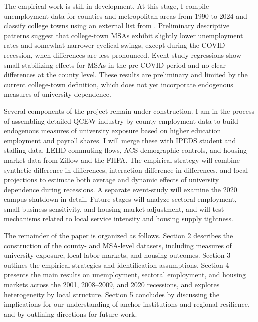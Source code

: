 The empirical work is still in development. At this stage, I compile unemployment data for counties and metropolitan areas from 1990 to 2024 and classify college towns using an external list from \citet{GumprechtBook}. Preliminary descriptive patterns suggest that college-town MSAs exhibit slightly lower unemployment rates and somewhat narrower cyclical swings, except during the COVID recession, when differences are less pronounced. Event-study regressions show small stabilizing effects for MSAs in the pre-COVID period and no clear differences at the county level. These results are preliminary and limited by the current college-town definition, which does not yet incorporate endogenous measures of university dependence.

Several components of the project remain under construction. I am in the process of assembling detailed QCEW industry-by-county employment data to build endogenous measures of university exposure based on higher education employment and payroll shares. I will merge these with IPEDS student and staffing data, LEHD commuting flows, ACS demographic controls, and housing market data from Zillow and the FHFA. The empirical strategy will combine synthetic difference in differences, interaction difference in differences, and local projections to estimate both average and dynamic effects of university dependence during recessions. A separate event-study will examine the 2020 campus shutdown in detail. Future stages will analyze sectoral employment, small-business sensitivity, and housing market adjustment, and will test mechanisms related to local service intensity and housing supply tightness.

The remainder of the paper is organized as follows. Section 2 describes the construction of the county- and MSA-level datasets, including measures of university exposure, local labor markets, and housing outcomes. Section 3 outlines the empirical strategies and identification assumptions. Section 4 presents the main results on unemployment, sectoral employment, and housing markets across the 2001, 2008--2009, and 2020 recessions, and explores heterogeneity by local structure. Section 5 concludes by discussing the implications for our understanding of anchor institutions and regional resilience, and by outlining directions for future work.











